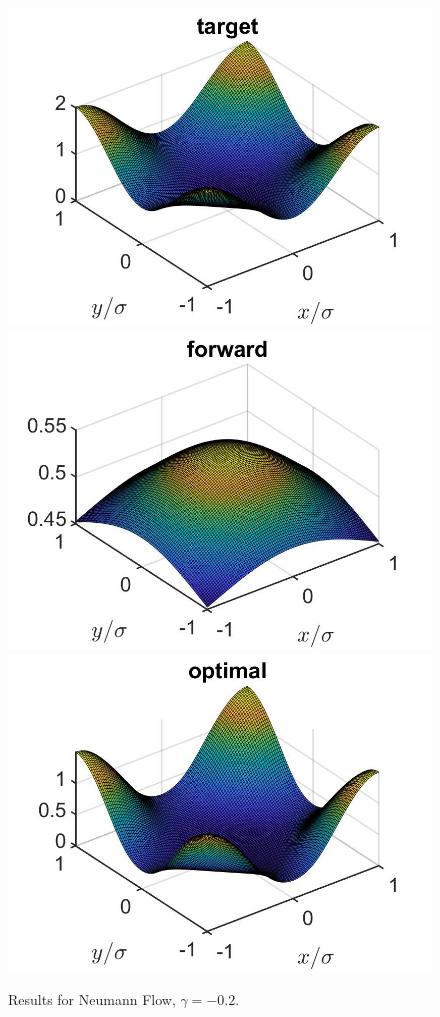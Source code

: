 \documentclass[11pt, a4paper]{article}
\theoremstyle{definition}
\begin{document}
\begin{figure}[h]
	\includegraphics[scale=0.3]{Tar2D1.jpg}
	\includegraphics[scale=0.3]{FW2D1.jpg}
	\includegraphics[scale=0.3]{Opt2D1.jpg}
	\caption{Results for Neumann Flow, $\gamma = -0.2$.}
	\label{Res2D1}
\end{figure}
\end{document}
